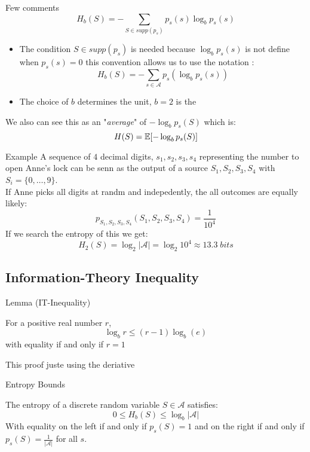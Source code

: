 \begin{parag}{Few comments}
    \[H_b(S) = - \sum_{S \in supp(p_s)}p_s(s)\log_bp_s(s)\]
    \begin{itemize}
        \item The condition $S \in supp(p_s)$ is needed because $\log_bp_s(s)$ is not define when $p_s(s) = 0$ this convention allows us to use the notation : 
        \[H_b(S) = - \sum_{s \in \mathcal{A}}p_s(\log_bp_s(s))\]
        \item The choice of $b$ determines the unit, $b= 2$ is the 
    \end{itemize}
    We also can see this as an "\textit{average}" of $-\log_b p_s(S)$ which is:
    \[H(S) = \mathbb{E} [-\log_bp_s(S)]\]
\end{parag}

\begin{parag}{Example}
    A sequence of $4$ decimal digits, $s_1, s_2, s_3, s_4$ representing the number to open Anne's lock can be senn as the output of a source $S_1, S_2, S_3, S_4$ with $S_i = \{0, \dots, 9\}$.
    \\
    If Anne picks all digits at randm and indepedently, the all outcomes are equally likely:
    \[p_{S_1, S_2, S_3, S_4}(S_1, S_2, S_3, S_4) = \frac{1}{10^4}\]
    If we search the entropy of this we get:
    \[H_2(S) = \log_2|\mathcal{A}| = \log_2 10^4 \approx 13.3 \; bits\]
\end{parag}

\subsection{Information-Theory Inequality}
\begin{parag}{Lemma (IT-Inequality)}
    \begin{lemme}
        For a positive real number $r$, 
        \[\log_b r \leq (r-1)\log_b(e)\]
        with equality if and only if $r = 1$
    \end{lemme}
    This proof juste using the deriative
    
\end{parag}
\begin{parag}{Entropy Bounds}
    \begin{theoreme}
        The entropy of a discrete  random variable $S \in \mathcal{A}$ satisfies:
        \[0 \leq H_b(S) \leq \log_b|\mathcal{A|}\]
        With equality on the left if and only if  $p_s(S) = 1$ and on the right if and only if $p_s(S) = \frac{1}{|\mathcal{A}|}$ for all  $s$.
    \end{theoreme}
\end{parag}
